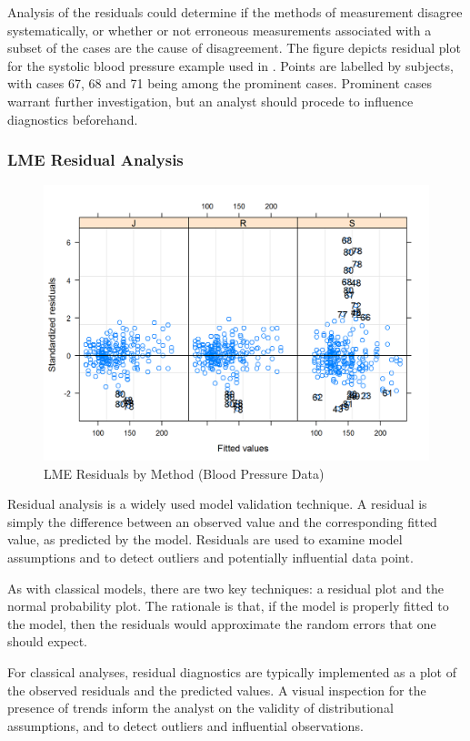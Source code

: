 \documentclass[]{report}
\begin{document}
	
Analysis of the residuals could determine if the methods of measurement disagree systematically, or whether or not erroneous measurements associated with a subset of the cases are the cause of disagreement. 
The figure depicts residual plot for the systolic blood pressure example used in \citet{BA99}. Points are labelled by subjects, with cases 67, 68 and 71 being among the prominent cases. Prominent cases warrant further investigation, but an analyst should procede to influence diagnostics beforehand.

\subsubsection{LME Residual Analysis}
\begin{figure}[h!]
	\centering
	\includegraphics[width=0.7\linewidth]{images/bloodnlme-ResidPlot}
	\caption{LME Residuals by Method (Blood Pressure Data)}
\end{figure}



Residual analysis is a widely used model validation technique. A residual is simply the difference between an observed value and the corresponding fitted value, as predicted by the model.  Residuals are used to examine model assumptions and to detect outliers and potentially influential data point. 

As with classical models, there are two key techniques: a residual plot and the normal probability plot. The rationale is that, if the model is properly fitted to the model, then the residuals would approximate the random errors that one should expect.

For classical analyses, residual diagnostics are typically implemented as a plot of the observed residuals and the predicted values. A visual inspection for the presence of trends inform the analyst on the validity of distributional assumptions, and to detect outliers and influential observations. 
	
\end{document}

